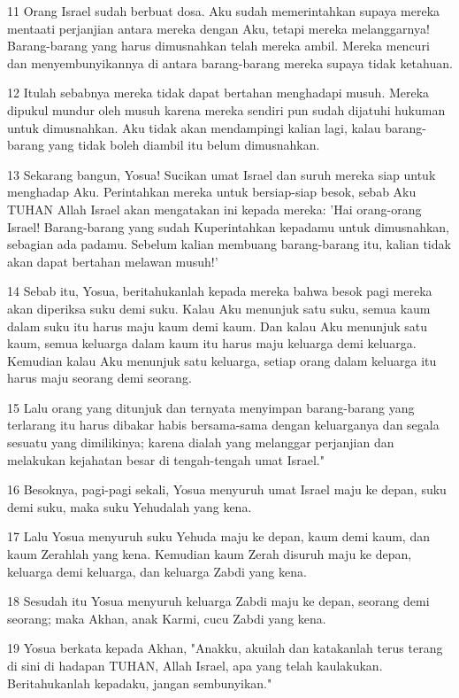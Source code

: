 \par 11 Orang Israel sudah berbuat dosa. Aku sudah memerintahkan supaya mereka mentaati perjanjian antara mereka dengan Aku, tetapi mereka melanggarnya! Barang-barang yang harus dimusnahkan telah mereka ambil. Mereka mencuri dan menyembunyikannya di antara barang-barang mereka supaya tidak ketahuan.
\par 12 Itulah sebabnya mereka tidak dapat bertahan menghadapi musuh. Mereka dipukul mundur oleh musuh karena mereka sendiri pun sudah dijatuhi hukuman untuk dimusnahkan. Aku tidak akan mendampingi kalian lagi, kalau barang-barang yang tidak boleh diambil itu belum dimusnahkan.
\par 13 Sekarang bangun, Yosua! Sucikan umat Israel dan suruh mereka siap untuk menghadap Aku. Perintahkan mereka untuk bersiap-siap besok, sebab Aku TUHAN Allah Israel akan mengatakan ini kepada mereka: 'Hai orang-orang Israel! Barang-barang yang sudah Kuperintahkan kepadamu untuk dimusnahkan, sebagian ada padamu. Sebelum kalian membuang barang-barang itu, kalian tidak akan dapat bertahan melawan musuh!'
\par 14 Sebab itu, Yosua, beritahukanlah kepada mereka bahwa besok pagi mereka akan diperiksa suku demi suku. Kalau Aku menunjuk satu suku, semua kaum dalam suku itu harus maju kaum demi kaum. Dan kalau Aku menunjuk satu kaum, semua keluarga dalam kaum itu harus maju keluarga demi keluarga. Kemudian kalau Aku menunjuk satu keluarga, setiap orang dalam keluarga itu harus maju seorang demi seorang.
\par 15 Lalu orang yang ditunjuk dan ternyata menyimpan barang-barang yang terlarang itu harus dibakar habis bersama-sama dengan keluarganya dan segala sesuatu yang dimilikinya; karena dialah yang melanggar perjanjian dan melakukan kejahatan besar di tengah-tengah umat Israel."
\par 16 Besoknya, pagi-pagi sekali, Yosua menyuruh umat Israel maju ke depan, suku demi suku, maka suku Yehudalah yang kena.
\par 17 Lalu Yosua menyuruh suku Yehuda maju ke depan, kaum demi kaum, dan kaum Zerahlah yang kena. Kemudian kaum Zerah disuruh maju ke depan, keluarga demi keluarga, dan keluarga Zabdi yang kena.
\par 18 Sesudah itu Yosua menyuruh keluarga Zabdi maju ke depan, seorang demi seorang; maka Akhan, anak Karmi, cucu Zabdi yang kena.
\par 19 Yosua berkata kepada Akhan, "Anakku, akuilah dan katakanlah terus terang di sini di hadapan TUHAN, Allah Israel, apa yang telah kaulakukan. Beritahukanlah kepadaku, jangan sembunyikan."
